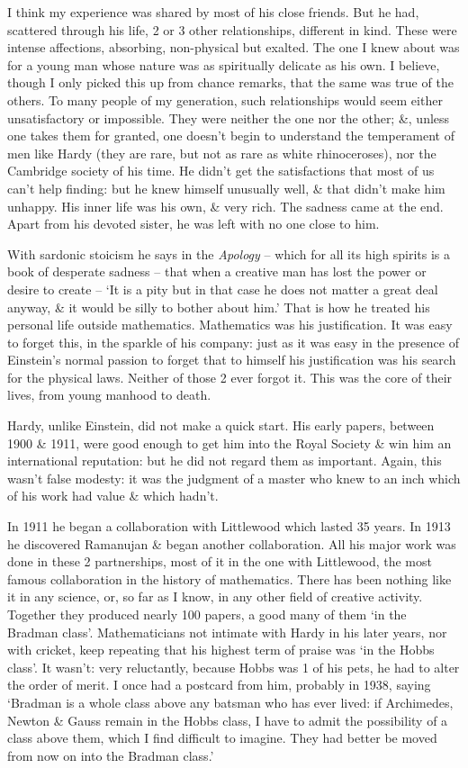\documentclass{article}
\numberwithin{equation}{section}
\begin{document}
I think my experience was shared by most of his close friends. But he had, scattered through his life, 2 or 3 other relationships, different in kind. These were intense affections, absorbing, non-physical but exalted. The one I knew about was for a young man whose nature was as spiritually delicate as his own. I believe, though I only picked this up from chance remarks, that the same was true of the others. To many people of my generation, such relationships would seem either unsatisfactory or impossible. They were neither the one nor the other; \&, unless one takes them for granted, one doesn't begin to understand the temperament of men like Hardy (they are rare, but not as rare as white rhinoceroses), nor the Cambridge society of his time. He didn't get the satisfactions that most of us can't help finding: but he knew himself unusually well, \& that didn't make him unhappy. His inner life was his own, \& very rich. The sadness came at the end. Apart from his devoted sister, he was left with no one close to him.

With sardonic stoicism he says in the \textit{Apology} -- which for all its high spirits is a book of desperate sadness -- that when a creative man has lost the power or desire to create -- `It is a pity but in that case he does not matter a great deal anyway, \& it would be silly to bother about him.' That is how he treated his personal life outside mathematics. Mathematics was his justification. It was easy to forget this, in the sparkle of his company: just as it was easy in the presence of Einstein's normal passion to forget that to himself his justification was his search for the physical laws. Neither of those 2 ever forgot it. This was the core of their lives, from young manhood to death.

Hardy, unlike Einstein, did not make a quick start. His early papers, between 1900 \& 1911, were good enough to get him into the Royal Society \& win him an international reputation: but he did not regard them as important. Again, this wasn't false modesty: it was the judgment of a master who knew to an inch which of his work had value \& which hadn't.

In 1911 he began a collaboration with Littlewood which lasted 35 years. In 1913 he discovered Ramanujan \& began another collaboration. All his major work was done in these 2 partnerships, most of it in the one with Littlewood, the most famous collaboration in the history of mathematics. There has been nothing like it in any science, or, so far as I know, in any other field of creative activity. Together they produced nearly 100 papers, a good many of them `in the Bradman class'. Mathematicians not intimate with Hardy in his later years, nor with cricket, keep repeating that his highest term of praise was `in the Hobbs class'. It wasn't: very reluctantly, because Hobbs was 1 of his pets, he had to alter the order of merit. I once had a postcard from him, probably in 1938, saying `Bradman is a whole class above any batsman who has ever lived: if Archimedes, Newton \& Gauss remain in the Hobbs class, I have to admit the possibility of a class above them, which I find difficult to imagine. They had better be moved from now on into the Bradman class.'
\end{document}
